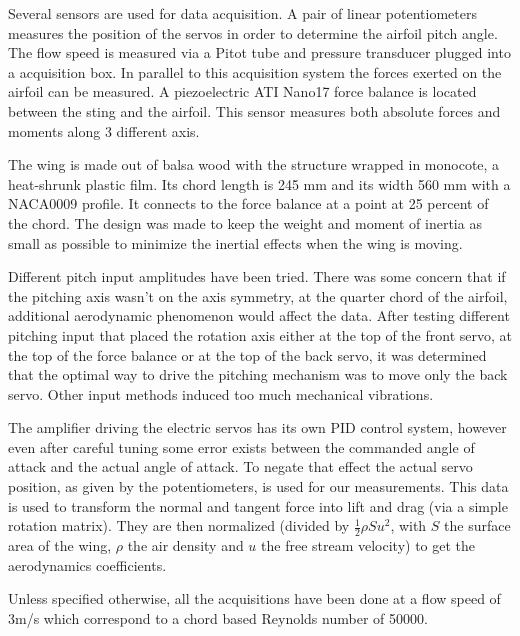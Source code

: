 \par Several sensors are used for data acquisition.
A pair of linear potentiometers measures the position of the servos in order to determine the airfoil pitch angle.
The flow speed is measured via a Pitot tube and pressure transducer plugged into a acquisition box.
In parallel to this acquisition system the forces exerted on the airfoil can be measured.
A piezoelectric ATI Nano17 force balance is located between the sting and the airfoil.
This sensor measures both absolute forces and moments along 3 different axis.

\par The wing is made out of balsa wood with the structure wrapped in monocote, a heat-shrunk plastic film.
Its chord length is 245 mm and its width 560 mm with a NACA0009 profile.
It connects to the force balance at a point at 25 percent of the chord.
The design was made to keep the weight and moment of inertia as small as possible to minimize the inertial effects when the wing is moving.


\FloatBarrier

Different pitch input amplitudes have been tried.
There was some concern that if the pitching axis wasn't on the axis symmetry, at the quarter chord of the airfoil, additional aerodynamic phenomenon would affect the data.
After testing different pitching input that placed the rotation axis either at the top of the front servo, at the top of the force balance or at the top of the back servo,  it was determined that the optimal way to drive the pitching mechanism was to move only the back servo.
Other input methods induced too much mechanical vibrations.

\par The amplifier driving the electric servos has its own PID control system, however even after careful tuning some error exists between the commanded angle of attack and the actual angle of attack.
To negate that effect the actual servo position, as given by the potentiometers, is used for our measurements.
This data is used to transform the normal and tangent force into lift and drag (via a simple rotation matrix). 
They are then normalized (divided by $\frac{1}{2}\rho S u^2$, with $S$ the surface area of the wing, $\rho$ the air density and $u$ the free stream velocity) to get the aerodynamics coefficients.

\par Unless specified otherwise, all the acquisitions have been done at a flow speed of 3m/s which correspond to a chord based Reynolds number of 50000.

